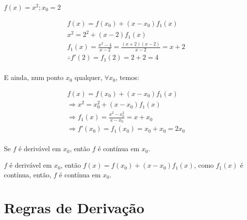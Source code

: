 \documentclass[11pt, oneside, a4paper]{gsm-l}
\begin{document}
\begin{exem}

$f\left( x \right) = x^2;x_0 = 2$

\end{exem}

\begin{sol}

\[
\begin{array}{l}
f\left( x \right) = f\left( {x_0 } \right) + \left( {x - x_0 } \right)f_1
\left( x \right) \\
x^2 = 2^2 + \left( {x - 2} \right)f_1 \left( x \right) \\
f_1 \left( x \right) = \frac{x^2 - 4}{x - 2} = \frac{\left( {x + 2}
\right)\left( {x - 2} \right)}{x - 2} = x + 2 \\
\therefore f'\left( 2 \right) = f_1 \left( 2 \right) = 2 + 2 = 4 \\
\end{array}
\]

E ainda, num ponto $x_0 $ qualquer, $\forall x_0 $, temos:

\[
\begin{array}{l}
f\left( x \right) = f\left( {x_0 } \right) + \left( {x - x_0 } \right)f_1
\left( x \right) \\
\Rightarrow x^2 = x_0^2 + \left( {x - x_0 } \right)f_1 \left( x \right) \\
\Rightarrow f_1 \left( x \right) = \frac{x^2 - x_0^2 }{x - x_0 } = x + x_0
\\
\Rightarrow f'\left( {x_0 } \right) = f_1 \left( {x_0 } \right) = x_0 + x_0 = 2x_0 \\
\end{array}
\]

\end{sol}

\begin{teo}
Se $f$ é derivável em $x_0 $, então $f$ é contínua em $x_0 $.
\end{teo}

\begin{dem}

$f$ é derivável em $x_0 $, então $f\left( x \right) = f\left( {x_0} \right) + \left( {x - x_0 } \right)f_1 \left( x \right)$, como $f_1 \left(x \right)$ é contínua, então, $f$ é contínua em $x_0$.

\end{dem}


\section{Regras de Derivação} \label{sec03}
\end{document}
